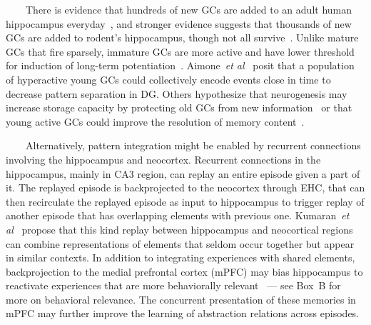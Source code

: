 \documentclass[letterpaper,11pt]{article}
\def\colorred#1{{\color{red}#1}}
\def\urlh#1{{}}
\def\emdash{---}
\def\etal{{\em{et al}}}
\begin{document}
\begin{center}
\begin{tcolorbox}[breakable,sharp corners=all,coltitle=black,colbacktitle=white,
    width=\textwidth,boxsep=5pt,left=5pt,right=5pt,
    title={\textbf{Box A: Pattern Separation, Completion and Integration}}]
~~~~There is evidence that hundreds of new GCs are added to an adult human hippocampus everyday~\cite{SpaldingetalCELL-13}, and stronger evidence suggests that thousands of new GCs are added to rodent’s hippocampus, though not all survive~\cite{KitabatakeetalNCNM-07}. Unlike mature GCs that fire sparsely, immature GCs are more active and have lower threshold for induction of long-term potentiation~\cite{AimoneetalNEURON-09,GeetalNATURE-06,Schmidt-HieberetalNATURE-04}. Aimone~\etal{}~\cite{AimoneetalNEURON-09} posit that a population of hyperactive young GCs could collectively encode events close in time to decrease pattern separation in DG. Others hypothesize that neurogenesis may increase storage capacity by protecting old GCs from new information~\cite{BeckerHIPPOCAMPUS-05,WiskottetalHIPPOCAMPUS-06} or that young active GCs could improve the resolution of memory content~\cite{AimoneetalNEURON-11}. 

~~~~Alternatively, pattern integration might be enabled by recurrent connections involving the hippocampus and neocortex. Recurrent connections in the hippocampus, mainly in CA3 region, can replay an entire episode given a part of it. The replayed episode is backprojected to the neocortex through EHC, that can then recirculate the replayed episode as input to hippocampus to trigger replay of another episode that has overlapping elements with previous one. Kumaran~\etal{}~\cite{KumaranetalTiCS-16} propose that this kind replay between hippocampus and neocortical regions can combine representations of elements that seldom occur together but appear in similar contexts. In addition to integrating experiences with shared elements, backprojection to the medial prefrontal cortex (mPFC) may bias hippocampus to reactivate experiences that are more behaviorally relevant~\cite{SchlichtingandPrestonCOiBS} {\emdash{}} see {\urlh{box_memories}{Box~\colorred{B}}} for more on behavioral relevance. The concurrent presentation of these memories in mPFC may further improve the learning of abstraction relations across episodes.

  \end{tcolorbox}
\end{center}




\end{document}
